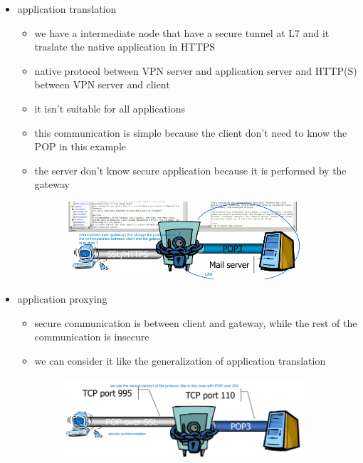 \documentclass{article}
\begin{document}
\begin{itemize}
\begin{itemize}
\begin{itemize}
\begin{itemize}
            \end{itemize}            
            \item application translation
            \begin{itemize}
                \item we have a intermediate node that have a secure tunnel at L7 and it traslate the native application in HTTPS
                \item native protocol between VPN server and application server and HTTP(S) between VPN server and client
                \item it isn't suitable for all applications 
                \item this communication is simple because the client don't need to know the POP in this example
                \item the server don't know secure application because it is performed by the gateway 
                 \begin{figure}[h]
                    \centering
                    \includegraphics[width=0.90\textwidth]{figure/application_translation.png}
                \end{figure}
            \end{itemize}
            \item application proxying
            \begin{itemize}
                \item secure communication is between client and gateway, while the rest of the communication is insecure
                \item we can consider it like the generalization of application translation 
                \begin{figure}[h]
                    \centering
                    \includegraphics[width=0.90\textwidth]{figure/application_proxying.png}

\end{figure}
\end{itemize}
\end{itemize}
\end{itemize}
\end{itemize}
\end{document}
